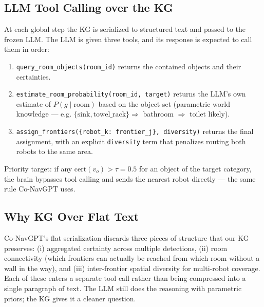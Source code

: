 \subsection{LLM Tool Calling over the KG}

At each global step the KG is serialized to structured text and passed to the
frozen LLM. The LLM is given three tools, and its response is expected to
call them in order:
\begin{enumerate}
    \item \texttt{query\_room\_objects(room\_id)} returns the contained
    objects and their certainties.
    \item \texttt{estimate\_room\_probability(room\_id, target)} returns the
    LLM's own estimate of $P(g\mid\text{room})$ based on the object set
    (parametric world knowledge --- e.g.
    $\{\text{sink},\text{towel\_rack}\}\Rightarrow$ bathroom $\Rightarrow$
    toilet likely).
    \item \texttt{assign\_frontiers(\{robot\_k: frontier\_j\}, diversity)}
    returns the final assignment, with an explicit \texttt{diversity} term
    that penalizes routing both robots to the same area.
\end{enumerate}

Priority target: if any $\text{cert}(v_o) > \tau{=}0.5$ for an object of the
target category, the brain bypasses tool calling and sends the nearest robot
directly --- the same rule Co-NavGPT uses.

\subsection{Why KG Over Flat Text}

Co-NavGPT's flat serialization discards three pieces of structure that our KG
preserves: (i) aggregated certainty across multiple detections, (ii) room
connectivity (which frontiers can actually be reached from which room
without a wall in the way), and (iii) inter-frontier spatial diversity for
multi-robot coverage. Each of these enters a separate tool call rather than
being compressed into a single paragraph of text. The LLM still does the
reasoning with parametric priors; the KG gives it a cleaner question.
